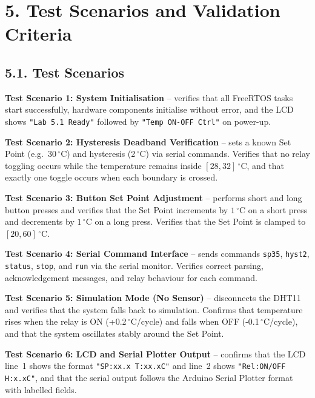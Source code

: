 \documentclass[12pt]{article}
\begin{document}
\section*{5. Test Scenarios and Validation Criteria}

\subsection*{5.1. Test Scenarios}

\textbf{Test Scenario 1: System Initialisation} -- verifies that all FreeRTOS
tasks start successfully, hardware components initialise without error, and the LCD
shows \texttt{"Lab 5.1 Ready"} followed by \texttt{"Temp ON-OFF Ctrl"} on power-up.

\textbf{Test Scenario 2: Hysteresis Deadband Verification} -- sets a known Set
Point (e.g.\ 30\,$^{\circ}$C) and hysteresis (2\,$^{\circ}$C) via serial commands.
Verifies that no relay toggling occurs while the temperature remains inside
$[28,32]\,^{\circ}$C, and that exactly one toggle occurs when each boundary is
crossed.

\textbf{Test Scenario 3: Button Set Point Adjustment} -- performs short and long
button presses and verifies that the Set Point increments by $1\,^{\circ}$C on a
short press and decrements by $1\,^{\circ}$C on a long press. Verifies that the
Set Point is clamped to $[20, 60]\,^{\circ}$C.

\textbf{Test Scenario 4: Serial Command Interface} -- sends commands
\texttt{sp35}, \texttt{hyst2}, \texttt{status}, \texttt{stop}, and \texttt{run}
via the serial monitor. Verifies correct parsing, acknowledgement messages, and
relay behaviour for each command.

\textbf{Test Scenario 5: Simulation Mode (No Sensor)} -- disconnects the DHT11
and verifies that the system falls back to simulation. Confirms that temperature
rises when the relay is ON (+0.2\,$^{\circ}$C/cycle) and falls when OFF
(-0.1\,$^{\circ}$C/cycle), and that the system oscillates stably around the Set
Point.

\textbf{Test Scenario 6: LCD and Serial Plotter Output} -- confirms that the LCD
line~1 shows the format \texttt{"SP:xx.x T:xx.xC"} and line~2 shows
\texttt{"Rel:ON/OFF H:x.xC"}, and that the serial output follows the Arduino
Serial Plotter format with labelled fields.
\end{document}
